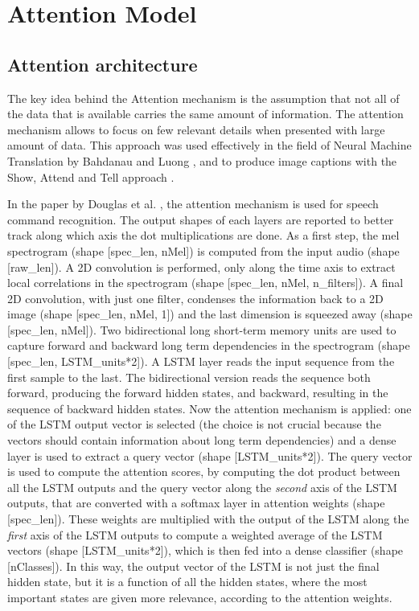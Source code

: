\section{Attention Model}
\label{sec:attention_model}

\subsection{Attention architecture}

The key idea behind the Attention mechanism is the assumption that not all of
the data that is available carries the same amount of information.
The attention mechanism allows to focus on few relevant details when presented
with large amount of data.
This approach was used effectively in the field of Neural Machine Translation
by Bahdanau \cite{bahdanau2016neural} and Luong \cite{luong2015effective}, and
to produce image captions with the Show, Attend and Tell approach
\cite{xu2016show}.

In the paper by Douglas et al. \cite{2018arXiv180808929C}, the attention
mechanism is used for speech command recognition.
The output shapes of each layers are reported to better track along which axis
the dot multiplications are done.
As a first step, the mel spectrogram
(shape [spec\_len, nMel])
is computed from the input audio
(shape [raw\_len]).
A 2D convolution is performed, only along the time axis to extract local
correlations in the spectrogram
(shape [spec\_len, nMel, n\_filters]).
A final 2D convolution, with just one filter, condenses the information back to
a 2D image
(shape [spec\_len, nMel, 1])
and the last dimension is squeezed away
(shape [spec\_len, nMel]).
Two bidirectional \cite{Schuster1997BidirectionalRN} long short-term memory
\cite{lstm} units are used to capture forward and backward long term
dependencies in the spectrogram
(shape [spec\_len, LSTM\_units*2]).
A LSTM layer reads the input sequence from the first sample to the last. The
bidirectional version reads the sequence both forward, producing the forward
hidden states, and backward, resulting in the sequence of backward hidden
states.
Now the attention mechanism is applied: one of the LSTM output vector is
selected (the choice is not crucial because the vectors should contain
information about long term dependencies) and a dense layer is used to extract
a query vector
(shape [LSTM\_units*2]).
The query vector is used to compute the attention scores, by computing the dot
product between all the LSTM outputs and the query vector along the
\textit{second} axis of the LSTM outputs, that are converted with a softmax
layer in attention weights
(shape [spec\_len]).
These weights are multiplied with the output of the LSTM along the
\textit{first} axis of the LSTM outputs to compute a weighted average of the
LSTM vectors
(shape [LSTM\_units*2]),
which is then fed into a dense classifier
(shape [nClasses]).
In this way, the output vector of the LSTM is not just the final hidden state,
but it is a function of all the hidden states, where the most important states
are given more relevance, according to the attention weights.

